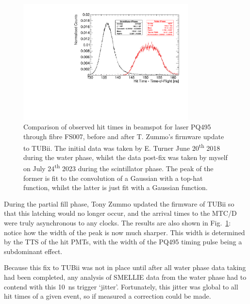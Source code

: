 \begin{figure}
    \centering
    \includegraphics[width=0.8\textwidth]{3_SMELLIEHardware/images/time_plots_comparison_114018_vs_302634_FS007_nice.pdf}
    \caption[Comparison of observed hit times in beamspot before and after TUBii firmware update]
    {Comparison of observed hit times in beamspot for laser PQ495 through fibre FS007, before and after T. Zummo's firmware update to TUBii. The initial data was taken by E. Turner June 20\textsuperscript{th} 2018 during the water phase, whilst the data post-fix was taken by myself on July 24\textsuperscript{th} 2023 during the scintillator phase. The peak of the former is fit to the convolution of a Gaussian with a top-hat function, whilst the latter is just fit with a Gaussian function.}
    \label{fig:smellie_beam_tres_tubii_comparison}
\end{figure}

During the partial fill phase, Tony Zummo updated the firmware of TUBii so that this latching would no longer occur, and the arrival times to the MTC/D were truly asynchronous to any clocks. The results are also shown in Fig.~\ref{fig:smellie_beam_tres_tubii_comparison}: notice how the width of the peak is now much sharper. This width is determined by the TTS of the hit PMTs, with the width of the PQ495 timing pulse being a subdominant effect.

Because this fix to TUBii was not in place until after all water phase data taking had been completed, any analysis of SMELLIE data from the water phase had to contend with this \SI{10}{\ns} trigger `jitter'. Fortunately, this jitter was global to all hit times of a given event, so if measured a correction could be made.


